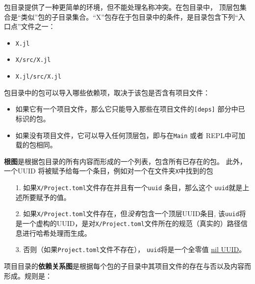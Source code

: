 包目录提供了一种更简单的环境，但不能处理名称冲突。在包目录中， 顶层包集合是“类似”包的子目录集合。“X”包存在于包目录中的条件，是目录包含下列“入口点”文件之一：



\begin{itemize}
\item \texttt{X.jl}


\item \texttt{X/src/X.jl}


\item \texttt{X.jl/src/X.jl}

\end{itemize}


包目录中的包可以导入哪些依赖项，取决于该包是否含有项目文件：



\begin{itemize}
\item 如果它有一个项目文件，那么它只能导入那些在项目文件的\texttt{[deps]} 部分中已标识的包。


\item 如果没有项目文件，它可以导入任何顶层包，即与在\texttt{Main} 或者 REPL中可加载的包相同。

\end{itemize}


\textbf{根图}是根据包目录的所有内容而形成的一个列表，包含所有已存在的包。 此外，一个UUID 将被赋予给每一个条目，例如对一个在文件夹\texttt{X}中找到的包



\begin{itemize}
\item[1. ] 如果\texttt{X/Project.toml}文件存在并且有一个\texttt{uuid} 条目，那么这个 \texttt{uuid}就是上述所要赋予的值。


\item[2. ] 如果\texttt{X/Project.toml}文件存在，但\emph{没有}包含一个顶层UUID条目, 该\texttt{uuid}将是一个虚构的UUID，是对\texttt{X/Project.toml}文件所在的规范（真实的）路径信息进行哈希处理而生成。


\item[3. ] 否则（如果\texttt{Project.toml}文件不存在）， \texttt{uuid}将是一个全零值 \href{https://en.wikipedia.org/wiki/Universally\_unique\_identifier\#Nil\_UUID}{nil UUID}。

\end{itemize}


项目目录的\textbf{依赖关系图}是根据每个包的子目录中其项目文件的存在与否以及内容而形成。规则是：



